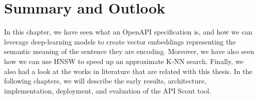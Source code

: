 \section{Summary and Outlook}\label{sec:summary-and-outlook}
In this chapter, we have seen what an OpenAPI specification is, and how we can leverage deep-learning models to create vector embeddings representing the semantic meaning of the sentence they are encoding.
Moreover, we have also seen how we can use HNSW to speed up an approximate K-NN search.
Finally, we also had a look at the works in literature that are related with this thesis.
In the following chapters, we will describe the early results, architecture, implementation, deployment, and evaluation of the API Scout tool.